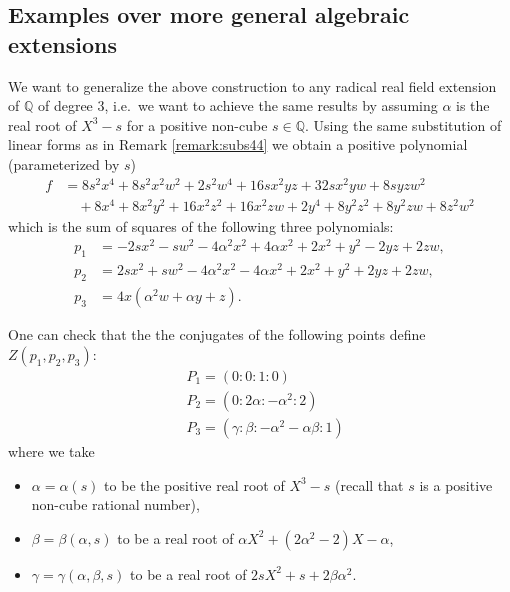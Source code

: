 \documentclass[a4paper,11pt]{amsart}%
\newcommand{\comment}[1]{}
\newcommand{\code}[1]{\texttt{#1}}
\newcommand{\vSmall}{\vspace{3mm}\noindent}
\newcommand\Q{\mathbb{Q}}
\theoremstyle{definition}
\begin{document}
\subsection{Examples over more general algebraic extensions}\label{t3-s}
We want to generalize the above construction to any radical real field extension of $\Q$ of
degree $3$, i.e.\ we want to achieve the same results by assuming $\alpha$ is the real
root of $X^3-s$ for a positive non-cube $s\in \Q$. Using the same substitution of linear forms as in Remark \ref{remark:subs44} we obtain a positive polynomial (parameterized by $s$)
\begin{align*}
f&=8s^2x^4+8s^2x^2w^2+2s^2w^4+16sx^2yz+32sx^2yw+8syzw^2\\
&\quad+8x^4+8x^2y^2+16x^2z^2+16x^2zw+2y^4+8y^2z^2+8y^2zw+8z^2w^2
\end{align*}
which is the sum of squares of the following three polynomials:
\begin{align*}
p_1 &= -2sx^2-sw^2-4\alpha^2x^2+4\alpha x^2+2x^2+y^2-2yz+2zw,\\
p_2 &= 2sx^2+sw^2-4\alpha^2x^2-4\alpha x^2+2x^2+y^2+2yz+2zw,\\
p_3 &= 4x(\alpha^2w+\alpha y+z).
\end{align*}

\vSmall
\comment{
With \code{Maple} we solve for the vanishing points $Z(p_1,p_2,p_3)$, i.e.
\begin{lstlisting}
solve([-2sx0^2-sx3^2-4T^2x0^2+4Tx0^2+2x0^2+x1^2-2x1x2+2x2x3,
  2sx0^2+sx3^2-4T^2x0^2-4Tx0^2+2x0^2+x1^2+2x1x2+2x2x3,
  4T^2x0x3+4Tx0x1+4x0x2, T^3-s],[x0,x1,x2,x3,T]);
\end{lstlisting}
and we get the following parametrization (this also follows from the fact that the vanishing points
will lie in intersection of conic curves in the sections of the hyperplanes defined by the factors
of $p_3$)
}
One can check that the the conjugates of the following points define\\ $Z(p_1,p_2,p_3)$:
\begin{align*}
&P_1=(0:0:1:0)\\
&P_2=(0:2\alpha:-\alpha^2:2)\\
&P_3=(\gamma:\beta:-\alpha^2-\alpha\beta:1)
\end{align*}
where we take
\begin{itemize}
\item $\alpha=\alpha(s)$ to be the positive real root of $X^3-s$ (recall that $s$ is a positive non-cube
rational number),
\item $\beta = \beta(\alpha,s)$ to be a real root of $\alpha X^2+(2\alpha^2-2)X-\alpha$,
\item $\gamma =\gamma(\alpha,\beta,s)$ to be a real root of $2sX^2+s+2\beta\alpha^2$.
\end{itemize}
\end{document}
